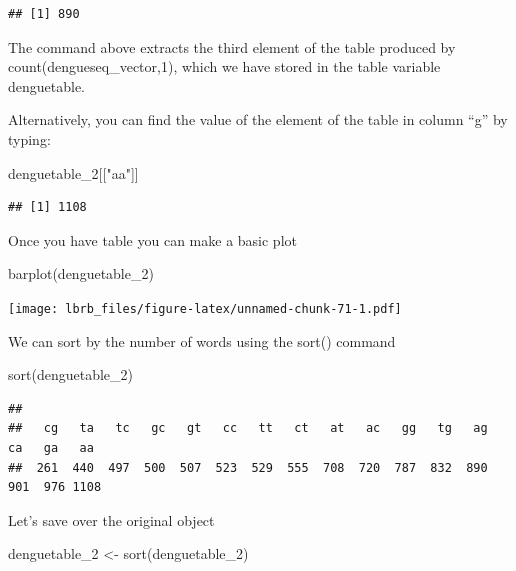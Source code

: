 \documentclass[
]{book}
\newenvironment{Shaded}{\begin{snugshade}}{\end{snugshade}}
\newcommand{\FunctionTok}[1]{\textcolor[rgb]{0.00,0.00,0.00}{#1}}
\newcommand{\NormalTok}[1]{#1}
\newcommand{\OtherTok}[1]{\textcolor[rgb]{0.56,0.35,0.01}{#1}}
\newcommand{\StringTok}[1]{\textcolor[rgb]{0.31,0.60,0.02}{#1}}
\begin{document}
\begin{verbatim}
## [1] 890
\end{verbatim}

The command above extracts the third element of the table produced by count(dengueseq\_vector,1), which we have stored in the table variable denguetable.

Alternatively, you can find the value of the element of the table in column ``g'' by typing:

\begin{Shaded}
\begin{Highlighting}[]
\NormalTok{denguetable\_2[[}\StringTok{"aa"}\NormalTok{]]}
\end{Highlighting}
\end{Shaded}

\begin{verbatim}
## [1] 1108
\end{verbatim}

Once you have table you can make a basic plot

\begin{Shaded}
\begin{Highlighting}[]
\FunctionTok{barplot}\NormalTok{(denguetable\_2)}
\end{Highlighting}
\end{Shaded}

\texttt{[image: lbrb\_files/figure-latex/unnamed-chunk-71-1.pdf]}

We can sort by the number of words using the sort() command

\begin{Shaded}
\begin{Highlighting}[]
\FunctionTok{sort}\NormalTok{(denguetable\_2)}
\end{Highlighting}
\end{Shaded}

\begin{verbatim}
## 
##   cg   ta   tc   gc   gt   cc   tt   ct   at   ac   gg   tg   ag   ca   ga   aa 
##  261  440  497  500  507  523  529  555  708  720  787  832  890  901  976 1108
\end{verbatim}

Let's save over the original object

\begin{Shaded}
\begin{Highlighting}[]
\NormalTok{denguetable\_2 }\OtherTok{\textless{}{-}} \FunctionTok{sort}\NormalTok{(denguetable\_2)}
\end{Highlighting}
\end{Shaded}
\end{document}
